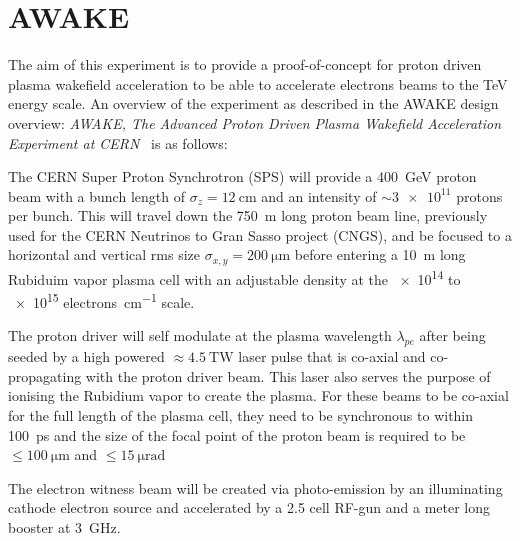 
\section{AWAKE}

The aim of this experiment is to provide a proof-of-concept for proton driven
plasma wakefield acceleration to be able to accelerate electrons beams to the
\si{\tera\electronvolt} energy scale. An overview of the experiment as described
in the AWAKE design overview: \emph{AWAKE, The Advanced Proton Driven Plasma
Wakefield Acceleration Experiment at CERN}~\cite{Gschwendtner2015rni} is as
follows:

The CERN Super Proton Synchrotron (SPS) will provide a
\SI{400}{\giga\electronvolt} proton beam with a bunch length of \(\sigma_z =
\SI{12}{\centi\meter}\) and an intensity of \(\sim \num{3e11}\) protons per
bunch. This will travel down the \SI{750}{\meter} long proton beam line,
previously used for the CERN Neutrinos to Gran Sasso project (CNGS), and be
focused to a horizontal and vertical rms size \(\sigma_{x,y} =
\SI{200}{\micro\meter}\) before entering a \SI{10}{\meter} long Rubiduim vapor
plasma cell with an adjustable density at the \num{e14} to \num{e15}
\si{electrons\per\centi\meter} scale.

The proton driver will self modulate at the plasma wavelength \(\lambda_{pe}\)
after being seeded by a high powered \(\approx \SI{4.5}{\tera\watt}\) laser
pulse that is co-axial and co-propagating with the proton driver beam. This
laser also serves the purpose of ionising the Rubidium vapor to create the
plasma. For these beams to be co-axial for the full length of the plasma cell,
they need to be synchronous to within \SI{100}{\pico\second} and the size of the
focal point of the proton beam is required to be \(\le\SI{100}{\micro\meter}\)
and \(\le\SI{15}{\micro\radian}\)

The electron witness beam will be created via photo-emission by an illuminating
cathode electron source and accelerated by a 2.5 cell RF-gun and a meter long
booster at \SI{3}{\giga\hertz}.





